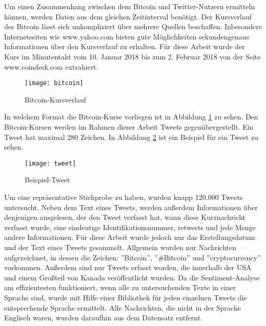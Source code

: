 
Um einen Zusammenhang zwischen dem Bitcoin und Twitter-Nutzern ermitteln k\"onnen, werden Daten aus dem gleichen Zeitinterval ben\"otigt. Der Kursverlauf des Bitcoin l\"asst sich unkompliziert \"uber mehrere Quellen beschaffen. Inbesondere Internetseiten wie www.yahoo.com bieten gute M\"oglichkeiten sekundengenaue Informationen \"uber den Kursverlauf zu erhalten. F\"ur diese Arbeit wurde der Kurs im Minutentakt vom 10. Januar 2018 bis zum 2. Februar 2018 von der Seite www.coindesk.com extrahiert. 

\begin{figure}[htb]
	\texttt{[image: bitcoin]}
	\caption{Bitcoin-Kursverlauf}
	\label{fig:bitcoin-course}
\end{figure}

In welchem Format die Bitcoin-Kurse vorliegen ist in Abbildung \ref{fig:bitcoin-course} zu sehen.
\newline
Den Bitcoin-Kursen werden im Rahmen dieser Arbeit Tweets gegen\"ubergestellt. Ein Tweet hat maximal 280 Zeichen. In Abbildung \ref{fig:tweet} ist ein Beispiel für ein Tweet zu sehen. 

\begin{figure}[htb]
	\texttt{[image: tweet]}
	\caption{Beispiel-Tweet}
	\label{fig:tweet}
\end{figure}

Um eine repr\"asentative Stichprobe zu haben, wurden knapp 120.000 Tweets untersucht. Neben dem Text eines Tweets, werden außerdem Informationen \"uber denjenigen ausgelesen, der den Tweet verfasst hat, wann diese Kurznachricht verfasst wurde, eine eindeutige Identifikationsnummer, retweets und jede Menge andere Informationen. F\"ur diese Arbeit wurde jedoch nur das Erstellungsdatum und der Text eines Tweets gesammelt. Allgemein wurden nur Nachrichten aufgezeichnet, in dessen die Zeichen: ''Bitcoin'', ''\#Bitcoin'' und ''cryptocurrency'' vorkommen.
Außerdem sind nur Tweets erfasst worden, die innerhalb der USA und einem Großteil von Kanada ver\"offentlicht wurden.
Da die Sentiment-Analyse am effizientesten funktioniert, wenn alle zu untersuchenden Texte in einer Sprache sind, wurde mit Hilfe einer Bibliothek f\"ur jeden einzelnen Tweets die entsprechende Sprache ermittelt. Alle Nachrichten, die nicht in der Sprache Englisch waren, wurden daraufhin aus dem Datensatz entfernt.